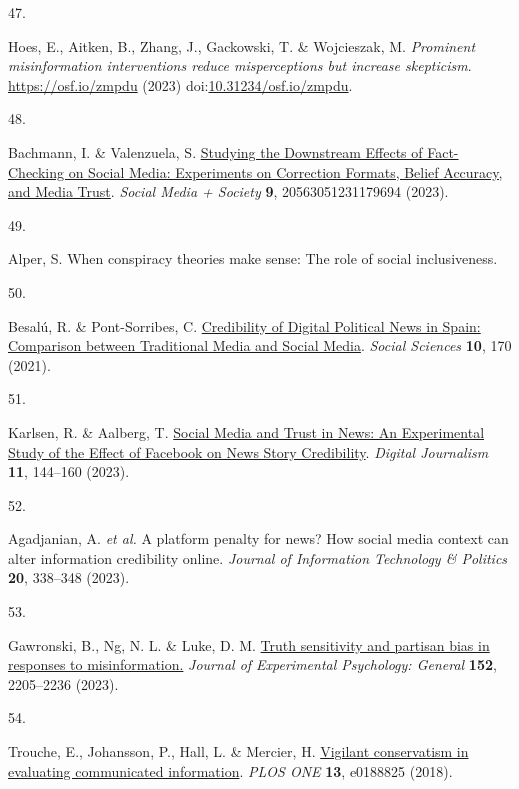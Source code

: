 \documentclass[
  doc,floatsintext]{apa6}
\newlength{\cslhangindent}
\newlength{\csllabelwidth}
\newenvironment{CSLReferences}[2] %
 {\begin{list}{}{%
  \setlength{\itemindent}{0pt}
  \setlength{\leftmargin}{0pt}
  \setlength{\parsep}{0pt}
  \ifodd #1
   \setlength{\leftmargin}{\cslhangindent}
   \setlength{\itemindent}{-1\cslhangindent}
  \fi
  \setlength{\itemsep}{#2\baselineskip}}}
 {\end{list}}
\newcommand{\CSLLeftMargin}[1]{\parbox[t]{\csllabelwidth}{\strut#1\strut}}
\newcommand{\CSLRightInline}[1]{\parbox[t]{\linewidth - \csllabelwidth}{\strut#1\strut}}
\begin{document}
\begin{CSLReferences}{0}{0}
\CSLLeftMargin{47. }%
\CSLRightInline{Hoes, E., Aitken, B., Zhang, J., Gackowski, T. \& Wojcieszak, M. \emph{Prominent misinformation interventions reduce misperceptions but increase skepticism}. \url{https://osf.io/zmpdu} (2023) doi:\href{https://doi.org/10.31234/osf.io/zmpdu}{10.31234/osf.io/zmpdu}.}

\CSLLeftMargin{48. }%
\CSLRightInline{Bachmann, I. \& Valenzuela, S. \href{https://doi.org/10.1177/20563051231179694}{Studying the Downstream Effects of Fact-Checking on Social Media: Experiments on Correction Formats, Belief Accuracy, and Media Trust}. \emph{Social Media + Society} \textbf{9}, 20563051231179694 (2023).}

\CSLLeftMargin{49. }%
\CSLRightInline{Alper, S. When conspiracy theories make sense: The role of social inclusiveness.}

\CSLLeftMargin{50. }%
\CSLRightInline{Besalú, R. \& Pont-Sorribes, C. \href{https://doi.org/10.3390/socsci10050170}{Credibility of Digital Political News in Spain: Comparison between Traditional Media and Social Media}. \emph{Social Sciences} \textbf{10}, 170 (2021).}

\CSLLeftMargin{51. }%
\CSLRightInline{Karlsen, R. \& Aalberg, T. \href{https://doi.org/10.1080/21670811.2021.1945938}{Social Media and Trust in News: An Experimental Study of the Effect of Facebook on News Story Credibility}. \emph{Digital Journalism} \textbf{11}, 144--160 (2023).}

\CSLLeftMargin{52. }%
\CSLRightInline{Agadjanian, A. \emph{et al.} A platform penalty for news? How social media context can alter information credibility online. \emph{Journal of Information Technology \& Politics} \textbf{20}, 338--348 (2023).}

\CSLLeftMargin{53. }%
\CSLRightInline{*Gawronski, B., Ng, N. L. \& Luke, D. M. \href{https://doi.org/10.1037/xge0001381}{Truth sensitivity and partisan bias in responses to misinformation.} \emph{Journal of Experimental Psychology: General} \textbf{152}, 2205--2236 (2023).}

\CSLLeftMargin{54. }%
\CSLRightInline{Trouche, E., Johansson, P., Hall, L. \& Mercier, H. \href{https://doi.org/10.1371/journal.pone.0188825}{Vigilant conservatism in evaluating communicated information}. \emph{PLOS ONE} \textbf{13}, e0188825 (2018).}


\end{CSLReferences}
\end{document}
